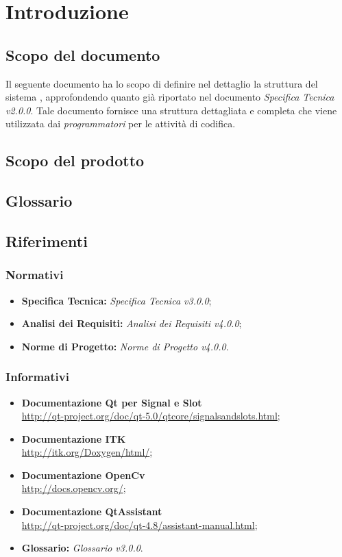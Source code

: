 \section{Introduzione}
\label{introduzione}
	\subsection{Scopo del documento}
	\label{scopo_doc}
	Il seguente documento ha lo scopo di definire nel dettaglio la struttura del sistema \project{}, approfondendo quanto già riportato nel documento \emph{Specifica Tecnica v2.0.0}. Tale documento fornisce una struttura dettagliata e completa che viene utilizzata dai \emph{programmatori} per le attività di codifica.
	\subsection{Scopo del prodotto}
	\label{scopo_prodotto}
	\scopoProd{}
	\subsection{Glossario}
	\label{glossario}
	\glossIntro{}
	\subsection{Riferimenti}
	\label{riferimenti}
		\subsubsection{Normativi}
		\label{normativi}
		\begin{itemize}
		\item \textbf{Specifica Tecnica:} \emph{Specifica Tecnica v3.0.0};
		\item \textbf{Analisi dei Requisiti:} \emph{Analisi dei Requisiti v4.0.0};
		\item \textbf{Norme di Progetto:} \emph{Norme di Progetto v4.0.0}.
		\end{itemize}
		\subsubsection{Informativi}
		\begin{itemize}
		\item \textbf{Documentazione Qt\g{} per Signal\g{} e Slot\g{}} \\ \url{http://qt-project.org/doc/qt-5.0/qtcore/signalsandslots.html};
		\item \textbf{Documentazione ITK\g{}} \\ \url{http://itk.org/Doxygen/html/};
		\item \textbf{Documentazione OpenCv} \\ \url{http://docs.opencv.org/};
		\item \textbf{Documentazione QtAssistant} \\ \url{http://qt-project.org/doc/qt-4.8/assistant-manual.html};
		\item \textbf{Glossario:} \emph{Glossario v3.0.0}.
		\end{itemize}